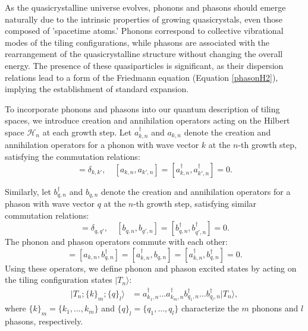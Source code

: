 \documentclass{article}
\begin{document}
As the quasicrystalline universe evolves, phonons and phasons should emerge naturally due to the intrinsic properties of growing quasicrystals, even those composed of 'spacetime atoms.' Phonons correspond to collective vibrational modes of the tiling configurations, while phasons are associated with the rearrangement of the quasicrystalline structure without changing the overall energy. The presence of these quasiparticles is significant, as their dispersion relations lead to a form of the Friedmann equation (Equation \ref{phasonH2}), implying the establishment of standard expansion.

To incorporate phonons and phasons into our quantum description of tiling spaces, we introduce creation and annihilation operators acting on the Hilbert space $\mathcal{H}_n$ at each growth step. Let $a^{\dagger}_{k,n}$ and $a_{k,n}$ denote the creation and annihilation operators for a phonon with wave vector $k$ at the $n$-th growth step, satisfying the commutation relations:
\begin{equation}
[a_{k,n}, a^{\dagger}_{k',n}] = \delta_{k,k'}, \quad [a_{k,n}, a_{k',n}] = [a^{\dagger}_{k,n}, a^{\dagger}_{k',n}] = 0.
\end{equation}

Similarly, let $b^{\dagger}_{q,n}$ and $b_{q,n}$ denote the creation and annihilation operators for a phason with wave vector $q$ at the $n$-th growth step, satisfying similar commutation relations:
\begin{equation}
[b_{q,n}, b^{\dagger}_{q',n}] = \delta_{q,q'}, \quad [b_{q,n}, b_{q',n}] = [b^{\dagger}_{q,n}, b^{\dagger}_{q',n}] = 0.
\end{equation}
The phonon and phason operators commute with each other:
\begin{equation}
[a_{k,n}, b_{q,n}] = [a_{k,n}, b^{\dagger}_{q,n}] = [a^{\dagger}_{k,n}, b_{q,n}] = [a^{\dagger}_{k,n}, b^{\dagger}_{q,n}] = 0.
\end{equation}
Using these operators, we define phonon and phason excited states by acting on the tiling configuration states $|T_n\rangle$:
\begin{align}
|T_n; \{k\}_m; \{q\}_l\rangle &= a^{\dagger}_{k_1,n} \ldots a^{\dagger}_{k_m,n} b^{\dagger}_{q_1,n} \ldots b^{\dagger}_{q_l,n} |T_n\rangle,
\end{align}
where $\{k\}_m = \{k_1, \ldots, k_m\}$ and $\{q\}_l = \{q_1, \ldots, q_l\}$ characterize the $m$ phonons and $l$ phasons, respectively.
\end{document}
